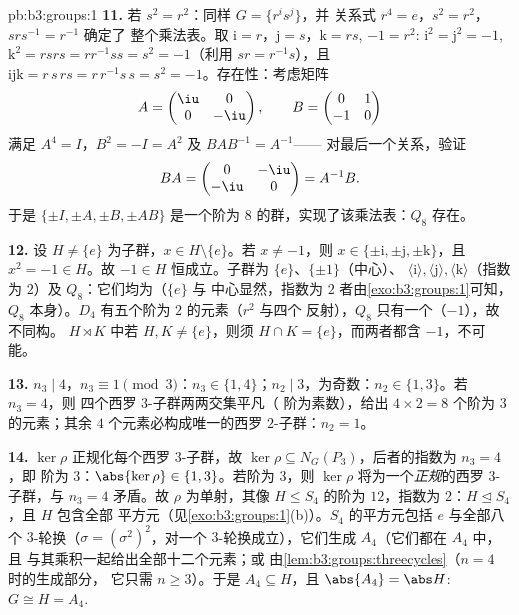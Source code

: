 \begin{solution}{pb:b3:groups:1}
\textbf{11.} 若 $s^2 = r^2$：同样 $G = \{r^i s^j\}$，并
关系式 $r^4 = e$，$s^2 = r^2$，$srs^{-1} = r^{-1}$ 确定了
整个乘法表。取 $\mathrm i = r$，$\mathrm j = s$，$\mathrm k =
rs$, $-1 = r^2$: $\mathrm i^2 = \mathrm j^2 = -1$, $\mathrm k^2 =
rsrs = r r^{-1} s s = s^2 = -1$（利用 $sr = r^{-1}s$），且
$\mathrm i \mathrm j \mathrm k = r\,s\,rs = r\,r^{-1}s\,s = s^2 =
-1$。存在性：考虑矩阵
\[
A = \begin{pmatrix} \iu & 0\\ 0 & -\iu \end{pmatrix},
\qquad
B = \begin{pmatrix} 0 & 1\\ -1 & 0 \end{pmatrix}
\]
满足 $A^4 = I$，$B^2 = -I = A^2$ 及 $BAB^{-1} = A^{-1}$——
对最后一个关系，验证
\[
BA = \begin{pmatrix} 0 & -\iu\\ -\iu & 0 \end{pmatrix} = A^{-1}B .
\]
于是 $\{\pm I, \pm A, \pm B, \pm AB\}$ 是一个阶为 $8$
的群，实现了该乘法表：$Q_8$ 存在。

\textbf{12.} 设 $H \neq \{e\}$ 为子群，$x \in H
\setminus \{e\}$。若 $x \neq -1$，则 $x \in \{\pm\mathrm i,
\pm\mathrm j, \pm\mathrm k\}$，且 $x^2 = -1 \in H$。故 $-1 \in H$
恒成立。子群为 $\{e\}$、$\{\pm 1\}$（中心）、
$\langle \mathrm i\rangle, \langle \mathrm j\rangle, \langle
\mathrm k\rangle$（指数为 $2$）及 $Q_8$：它们均为（$\{e\}$ 与
中心显然，指数为 $2$ 者由\cref{exo:b3:groups:1}可知，$Q_8$
本身）。$D_4$ 有五个阶为 $2$ 的元素（$r^2$ 与四个
反射），$Q_8$ 只有一个（$-1$），故不同构。
$H \rtimes K$ 中若 $H, K \neq \{e\}$，则须 $H \cap K =
\{e\}$，而两者都含 $-1$，不可能。

\textbf{13.} $n_3 \mid 4$，$n_3 \equiv 1 \pmod 3$：$n_3 \in \{1,
4\}$；$n_2 \mid 3$，为奇数：$n_2 \in \{1, 3\}$。若 $n_3 = 4$，则
四个西罗 $3$-子群两两交集平凡（
阶为素数），给出 $4 \times 2 = 8$ 个阶为 $3$ 的元素；其余
$4$ 个元素必构成唯一的西罗
$2$-子群：$n_2 = 1$。

\textbf{14.} $\ker\rho$ 正规化每个西罗 $3$-子群，故
$\ker \rho \subseteq N_G(P_3)$，后者的指数为 $n_3 = 4$，即
阶为 $3$：$\abs{\ker\rho} \in \{1, 3\}$。若阶为 $3$，则
$\ker\rho$ 将为一个\emph{正规}的西罗 $3$-子群，与 $n_3
= 4$ 矛盾。故 $\rho$ 为单射，其像 $H \leq S_4$ 的阶为
$12$，指数为 $2$：$H \trianglelefteq S_4$，且 $H$ 包含全部
平方元（见\cref{exo:b3:groups:1}(b)）。$S_4$ 的平方元包括
$e$ 与全部八个 $3$-轮换（$\sigma = (\sigma^2)^2$，对一个
$3$-轮换成立），它们生成 $A_4$（它们都在 $A_4$ 中，且
与其乘积一起给出全部十二个元素；或
由\cref{lem:b3:groups:threecycles}（$n = 4$ 时的生成部分，
它只需 $n \geq 3$）。于是 $A_4 \subseteq H$，且 $\abs{A_4}
= \abs H$: $G \cong H = A_4$.


\end{solution}
